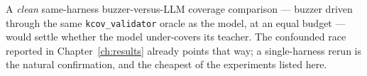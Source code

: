 A \emph{clean} same-harness buzzer-versus-LLM coverage comparison --- buzzer driven
through the same \texttt{kcov\_validator} oracle as the model, at an equal budget ---
would settle whether the model under-covers its teacher. The confounded race reported
in Chapter~\ref{ch:results} already points that way; a single-harness rerun is the
natural confirmation, and the cheapest of the experiments listed here.
